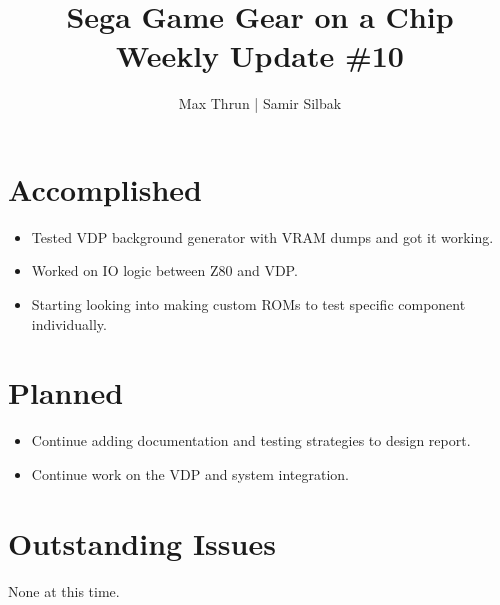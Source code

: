 \documentclass[12pt]{article}
\title{Sega Game Gear on a Chip \\ Weekly Update \#10}
\author{ Max Thrun | Samir Silbak }
\begin{document}
\maketitle

\section*{Accomplished}
\begin{itemize}
    \item Tested VDP background generator with VRAM dumps and got it working.
    \item Worked on IO logic between Z80 and VDP.
    \item Starting looking into making custom ROMs to test specific component individually.
\end{itemize}

\section*{Planned}
\begin{itemize}
    \item Continue adding documentation and testing strategies to design report.
    \item Continue work on the VDP and system integration.
\end{itemize}

\section*{Outstanding Issues}
None at this time.

\vspace{.1in}
\end{document}
